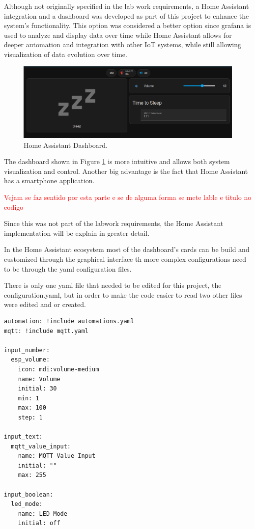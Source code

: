 Although not originally specified in the lab work requirements, a Home Assistant integration and a dashboard was developed as part of this project to enhance the system's functionality. This option was considered a better option since grafana is used to analyze and display data over time while Home Assistant allows for deeper automation and integration with other IoT systems, while still allowing visualization of data evolution over time. 

\begin{figure}[H]
    \centering
    \includegraphics*[scale = 0.5]{Images/HADashboard.png}
    \caption{Home Assistant Dashboard.}
    \label{fig:HADashboard}
\end{figure}

The dashboard shown in Figure \ref{fig:HADashboard} is more intuitive and allows both system visualization and control. Another big advantage is the fact that Home Assistant has a smartphone application.

\textcolor{red}{Vejam se faz sentido por esta parte e se de alguma forma se mete lable e titulo no codigo}

Since this was not part of the labwork requirements, the Home Assistant implementation will be explain in greater detail. 

In the Home Assistant ecosystem most of the dashboard's cards can be build and customized through the graphical interface th more complex configurations need to be through the yaml configuration files. 

There is only one yaml file that needed to be edited for this project, the configuration.yaml, but in order to make the code easier to read two other files were edited and or created. 
% 
\begin{verbatim}
automation: !include automations.yaml
mqtt: !include mqtt.yaml

input_number:
  esp_volume:
    icon: mdi:volume-medium
    name: Volume
    initial: 30
    min: 1
    max: 100
    step: 1

input_text:
  mqtt_value_input:
    name: MQTT Value Input
    initial: ""
    max: 255

input_boolean:
  led_mode:
    name: LED Mode
    initial: off
\end{verbatim}

